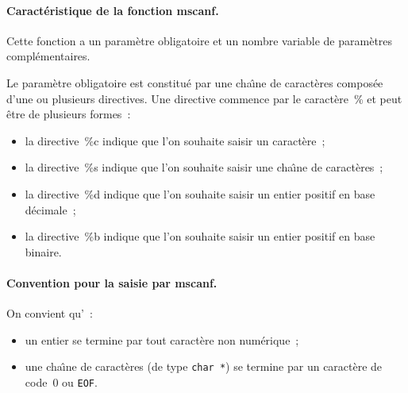 \paragraph{Caract\'eristique de la fonction mscanf.}
Cette fonction a un param\`etre obligatoire et un nombre variable de
param\`etres compl\'ementaires. 
\par
Le param\`etre obligatoire est constitu\'e par une cha\^\i{}ne de
caract\`eres  compos\'ee d'une ou plusieurs directives.  Une directive
commence par le caract\`ere~\% et peut \^etre de plusieurs formes~:
\begin{itemize}
\item  la directive~\%c indique que l'on souhaite saisir un caract\`ere~;
\item la directive~\%s indique que l'on souhaite saisir une
  cha\^\i{}ne de caract\`eres~;
\item la directive~\%d indique que l'on souhaite saisir un entier positif en
  base d\'ecimale~;
\item la directive~\%b indique que l'on souhaite saisir un entier positif en
  base binaire.
\end{itemize}
\paragraph{Convention pour la saisie par mscanf.}
On convient qu'~:
\begin{itemize}
\item un entier se termine par tout caract\`ere non num\'erique~;
\item une cha\^\i{}ne de caract\`eres (de type \verb+char *+) se
  termine par un caract\`ere de code~$0$ ou \verb+EOF+.
\end{itemize}
